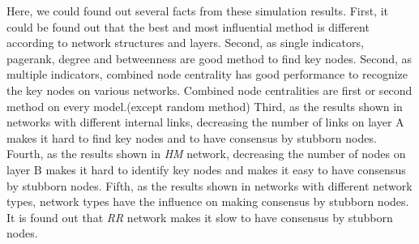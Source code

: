 Here, we could found out several facts from these simulation results. First, it could be found out that the best and most influential method is different according to network structures and layers. Second, as single indicators, pagerank, degree and betweenness are good method to find key nodes. Second, as multiple indicators, combined node centrality has good performance to recognize the key nodes on various networks. Combined node centralities are first or second method on every model.(except random method)  Third, as the results shown in networks with different internal links, decreasing the number of links on layer A makes it hard to find key nodes and to have consensus by stubborn nodes.  Fourth, as the results shown in \textit{HM} network, decreasing the number of nodes on layer B makes it hard to identify key nodes and makes it easy to have consensus by stubborn nodes. Fifth, as the results shown in networks with different network types, network types have the influence on making consensus by stubborn nodes. It is found out that \textit{RR} network makes it slow to have consensus by stubborn nodes. 




